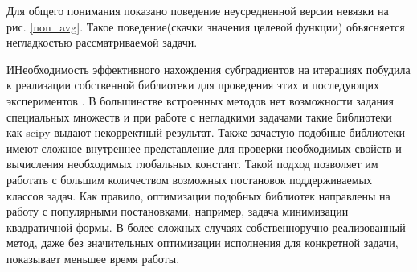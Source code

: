 Для общего понимания показано поведение неусредненной версии невязки на рис. \ref{non_avg}. Такое поведение(скачки значения целевой функции) объясняется негладкостью рассматриваемой задачи. 

ИНеобходимость эффективного нахождения субградиентов на итерациях побудила к реализации собственной библиотеки для проведения этих и последующих экспериментов \cite{mygit}. В большинстве встроенных методов нет возможности задания специальных  множеств и при работе с негладкими задачами такие библиотеки как scipy выдают некорректный результат. Также зачастую подобные библиотеки имеют сложное внутреннее представление для проверки необходимых свойств и вычисления необходимых глобальных констант. Такой подход позволяет им работать с большим количеством возможных постановок поддерживаемых классов задач. Как правило, оптимизации подобных библиотек направлены на работу с популярными постановками, например, задача минимизации квадратичной формы. В более сложных случаях собственноручно реализованный метод, даже без значительных оптимизации исполнения для конкретной задачи, показывает меньшее время работы. 

\FloatBarrier